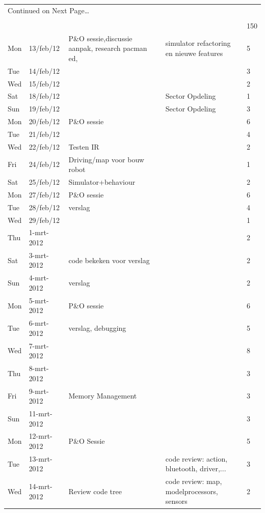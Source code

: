 \documentclass[12pt,a4paper]{report}
\begin{document}
\begin{landscape}
\begin{longtable}{llp{7cm}p{10cm}l}
\multicolumn{5}{l}{{Continued on Next Page\ldots}} \\
\endfoot

\\[-1.8ex] \hline \hline
\endlastfoot

\hline
 &  &  &  & 150 \\ 
\hline
Mon & 13/feb/12 & P\&O sessie,discussie aanpak, research pacman ed,  & simulator refactoring en nieuwe features & 5 \\ 
\hline
Tue & 14/feb/12 &  &  & 3 \\ 
\hline
Wed & 15/feb/12 &  &  & 2 \\ 
\hline
Sat & 18/feb/12 &  & Sector Opdeling & 1 \\ 
\hline
Sun & 19/feb/12 &  & Sector Opdeling & 3 \\ 
\hline
Mon & 20/feb/12 & P\&O sessie &  & 6 \\ 
\hline
Tue & 21/feb/12 &  &  & 4 \\ 
\hline
Wed & 22/feb/12 & Testen IR &  & 2 \\ 
\hline
Fri & 24/feb/12 & Driving/map voor bouw robot &  & 1 \\ 
\hline
Sat & 25/feb/12 & Simulator+behaviour &  & 2 \\ 
\hline
Mon & 27/feb/12 & P\&O sessie &  & 6 \\ 
\hline
Tue & 28/feb/12 & verslag &  & 4 \\ 
\hline
Wed & 29/feb/12 &  &  & 1 \\ 
\hline
Thu & 1-mrt-2012 &  &  & 2 \\ 
\hline
Sat & 3-mrt-2012 & code bekeken voor verslag &  & 2 \\ 
\hline
Sun & 4-mrt-2012 & verslag &  & 2 \\ 
\hline
Mon & 5-mrt-2012 & P\&O sessie &  & 6 \\ 
\hline
Tue & 6-mrt-2012 & verslag, debugging &  & 5 \\ 
\hline
Wed & 7-mrt-2012 &  &  & 8 \\ 
\hline
Thu & 8-mrt-2012 &  &  & 3 \\ 
\hline
Fri & 9-mrt-2012 & Memory Management &  & 3 \\ 
\hline
Sun & 11-mrt-2012 &  &  & 3 \\ 
\hline
Mon & 12-mrt-2012 & P\&O Sessie &  & 5 \\ 
\hline
Tue & 13-mrt-2012 &  & code review: action, bluetooth, driver,... & 3 \\ 
\hline
Wed & 14-mrt-2012 & Review code tree  & code review: map, modelprocessors, sensors & 2 \\ 

\end{longtable}
\end{landscape}
\end{document}
